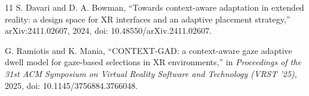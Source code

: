 \documentclass[conference]{IEEEtran}
\begin{document}
\begin{thebibliography}{11}
S. Davari and D. A. Bowman, ``Towards context-aware adaptation in extended reality: a design space for XR interfaces and an adaptive placement strategy,'' arXiv:2411.02607, 2024, doi: 10.48550/arXiv.2411.02607.

G. Ramiotis and K. Mania, ``CONTEXT-GAD: a context-aware gaze adaptive dwell model for gaze-based selections in XR environments,'' in \emph{Proceedings of the 31st ACM Symposium on Virtual Reality Software and Technology (VRST '25)}, 2025, doi: 10.1145/3756884.3766048.

\end{thebibliography}
\end{document}
